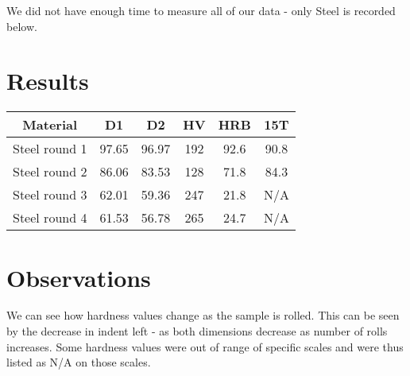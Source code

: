 \documentclass{article}
\begin{document}
We did not have enough time to measure all of our data - only Steel is recorded below.
\section{Results}

\begin{table}[h]
\centering
\begin{tabular}{|| c | c | c | c | c | c ||}
\hline
Material & D1 & D2 & HV & HRB & 15T\\
\hline
\hline
Steel round 1 & 97.65 & 96.97 & 192 & 92.6 & 90.8\\
\hline
Steel round 2 & 86.06 & 83.53 & 128 & 71.8 & 84.3\\
\hline
Steel round 3 & 62.01 & 59.36 & 247 & 21.8 & N/A\\
\hline
Steel round 4 & 61.53 & 56.78 & 265 & 24.7 & N/A\\
\hline
\end{tabular}
\end{table}

\section{Observations}

We can see how hardness values change as the sample is rolled. This can be seen by the decrease in indent left - as both dimensions decrease as number of rolls increases. Some hardness values were out of range of specific scales and were thus listed as N/A on those scales.
\end{document}
